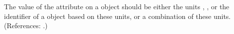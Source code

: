 The value of the attribute  on a \Model object should be
either the units , , or the identifier of a
\UnitDefinition object based on these units, or a combination of these units.  (References: .)
